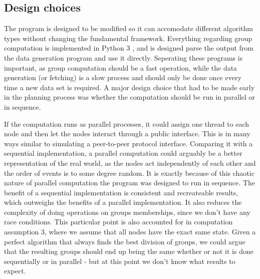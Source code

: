 \subsection{Design choices}
The program is designed to be modified so it can accomodate different algorithm types without changing the fundamental framework.
Everything regarding group computation is implemented in Python 3 \cite{Python3}, and is designed parse the output from the data generation program and use it directly.
Seperating these programs is important, as group computation should be a fast operation, while the data generation (or fetching) is a slow process and should only be done
once every time a new data set is required. A major design choice that had to be made early in the planning process was whether the computation should be run in parallel or in sequence. 

If the computation runs as parallel processes, it could assign one thread to each node and then let the nodes interact through a public interface. This is
in many ways similar to simulating a peer-to-peer protocol interface. Comparing it with a sequential implementation, a parallel computation could arguably be a better representation of the real world,
as the nodes act independently of each other and the order of events is to some degree random. It is exactly because of this chaotic nature of parallel computation
the program was designed to run in sequence. The benefit of a sequential implementation is consistent and recreateable results, which outweighs the benefits of a parallel implementation.
It also reduces the complexity of doing operations on groups memberships, since we don't have any race conditions. This particular point is also accounted for in computation assumption 3,
where we assume that all nodes have the exact same state. Given a perfect algorithm that always finds the best division of groups, we could argue that the resulting groups
should end up being the same whether or not it is done sequentially or in parallel - but at this point we don't know what results to expect. 

